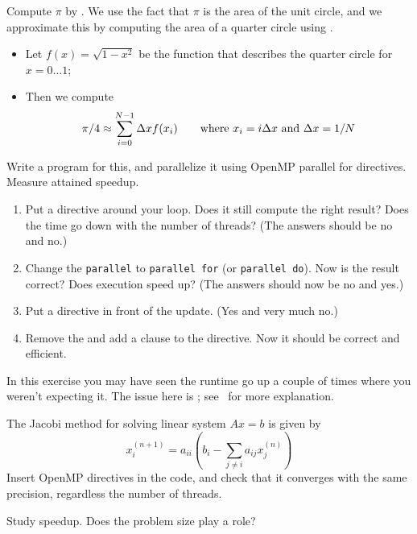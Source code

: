 \begin{exercise}
  \label{ex:omp-pi}
  Compute $\pi$ by . We use the fact that $\pi$
  is the area of the unit circle, and we approximate this by computing
  the area of a quarter circle using .
  \begin{itemize}
  \item Let $f(x)=\sqrt{1-x^2}$ be the function that describes the
    quarter circle for $x=0\ldots 1$;
  \item Then we compute \[ \pi/4\approx\sum_{i=0}^{N-1} \Delta x
    f(x_i) \qquad \hbox{where $x_i=i\Delta x$ and $\Delta x=1/N$} \]
  \end{itemize}
  Write a program for this, and parallelize it using OpenMP parallel
  for directives. Measure attained speedup.
  \begin{enumerate}
  \item Put a  directive around your loop. Does it still
    compute the right result? Does the time go down with the number of
    threads? (The answers should be no and no.)
  \item Change the \lstinline[language=omp]{parallel} to \lstinline[language=omp]{parallel for}
    (or \lstinline[language=omp]{parallel do}). Now is the result correct? Does execution speed up? (The
    answers should now be no and yes.)
  \item Put a  directive in front of the update. (Yes and
    very much no.)
  \item Remove the  and add a clause
     to the  directive.
    Now it should be correct and efficient.
  \end{enumerate}
\end{exercise}

\begin{remark}
  In this exercise you may have seen the runtime go up a couple of times
  where you weren't expecting it. The issue here is ; see~ for more explanation.
\end{remark}

\begin{exercise}[jacobi]
  \label{ex:omp-jacobi1}
  The Jacobi method for solving linear system $Ax=b$ is given by
  \[ x^{(n+1)}_i = a_{ii}\left(b_i-\sum_{j\not=i}a_{ij}x^{(n)}_j\right) \]
  Insert OpenMP directives in the code, and check that it converges
  with the same precision, regardless the number of threads.

  Study speedup. Does the problem size play a role?
\end{exercise}

